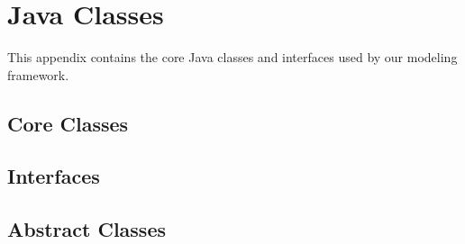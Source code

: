 \chapter{Java Classes} \label{java_classes}

This appendix contains the core Java classes and interfaces used by our modeling framework.

\section{Core Classes}
\begin{spacing}{.5}
	
	
	
	
	
	
	
	
	
	
	
\end{spacing}

\section{Interfaces}
\begin{spacing}{.5}
	
	
	
	
	
	
	
	
	
	
	
	
	
	
	
	
	
\end{spacing}

\section{Abstract Classes}
\begin{spacing}{.5}
	
	
	
	
	
	
	
\end{spacing}

